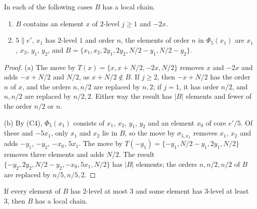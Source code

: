 \begin{lemma}\label{lem:threechains}
In each of the following cases $B$ has a local chain.
\begin{enumerate}[label=\textup{(\alph*)}]
\item $B$ contains an element $x$ of $2$-level $j\ge1$ and $-2x$.
\item $5\parallel e'$, $x_{1}$ has $2$-level $1$ and order $n$, the elements
of order $n$ in $\Phi_{5}(x_{1})$ are $x_{1}$, $x_{2}$, $y_{1}$, $y_{2}$, and
$B=\{x_{1},x_{2},2y_{1},2y_{2},N/2-y_{1},N/2-y_{2}\}$.
\end{enumerate}
\end{lemma}

\begin{proof}
(a) The move by $T(x)=\{x,x+N/2,-2x,N/2\}$ removes $x$ and $-2x$ and adds
$-x+N/2$ and $N/2$, as $x+N/2\notin B$. If $j\ge2$, then $-x+N/2$ has the
order $n$ of $x$, and the orders $n,n/2$ are replaced by $n,2$; if $j=1$, it
has order $n/2$, and $n,n/2$ are replaced by $n/2,2$. Either way the result
has $|B|$ elements and fewer of the order $n/2$ or $n$.

(b) By (C4), $\Phi_{5}(x_{1})$ consists of $x_{1}$, $x_{2}$, $y_{1}$, $y_{2}$
and an element $x_{0}$ of core $e'/5$. Of these and $-5x_{1}$, only $x_{1}$
and $x_{2}$ lie in $B$, so the move by $\sigma_{5,x_{1}}$ removes $x_{1}$,
$x_{2}$ and adds $-y_{1}$, $-y_{2}$, $-x_{0}$, $5x_{1}$. The move by
$T(-y_{1})=\{-y_{1},N/2-y_{1},2y_{1},N/2\}$ removes three elements and adds
$N/2$. The result $\{-y_{2},2y_{2},N/2-y_{2},-x_{0},5x_{1},N/2\}$ has $|B|$
elements; the orders $n,n/2,n/2$ of $B$ are replaced by $n/5,n/5,2$.
\end{proof}

\begin{proposition}\label{prop:threelevel}
If every element of $B$ has $2$-level at most $3$ and some element has
$3$-level at least $3$, then $B$ has a local chain.
\end{proposition}

